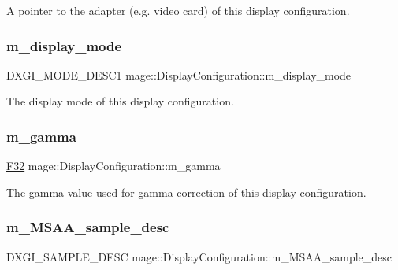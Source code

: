 A pointer to the adapter (e.\+g. video card) of this display configuration. \hypertarget{structmage_1_1_display_configuration_ac59d5e7c5553ef4842090bf1a83bd7ca}{}\label{structmage_1_1_display_configuration_ac59d5e7c5553ef4842090bf1a83bd7ca} 
\subsubsection{\texorpdfstring{m\+\_\+display\+\_\+mode}{m\_display\_mode}}
{\footnotesize\ttfamily D\+X\+G\+I\+\_\+\+M\+O\+D\+E\+\_\+\+D\+E\+S\+C1 mage\+::\+Display\+Configuration\+::m\+\_\+display\+\_\+mode\hspace{0.3cm}{\ttfamily [private]}}

The display mode of this display configuration. \hypertarget{structmage_1_1_display_configuration_a6056d18cba04331488bb27eb033c783e}{}\label{structmage_1_1_display_configuration_a6056d18cba04331488bb27eb033c783e} 
\subsubsection{\texorpdfstring{m\+\_\+gamma}{m\_gamma}}
{\footnotesize\ttfamily \hyperlink{namespacemage_aa97e833b45f06d60a0a9c4fc22ae02c0}{F32} mage\+::\+Display\+Configuration\+::m\+\_\+gamma\hspace{0.3cm}{\ttfamily [private]}}

The gamma value used for gamma correction of this display configuration. \hypertarget{structmage_1_1_display_configuration_a1d4de267f8edcd0044252b9658f426c3}{}\label{structmage_1_1_display_configuration_a1d4de267f8edcd0044252b9658f426c3} 
\subsubsection{\texorpdfstring{m\+\_\+\+M\+S\+A\+A\+\_\+sample\+\_\+desc}{m\_MSAA\_sample\_desc}}
{\footnotesize\ttfamily D\+X\+G\+I\+\_\+\+S\+A\+M\+P\+L\+E\+\_\+\+D\+E\+SC mage\+::\+Display\+Configuration\+::m\+\_\+\+M\+S\+A\+A\+\_\+sample\+\_\+desc\hspace{0.3cm}{\ttfamily [private]}}

